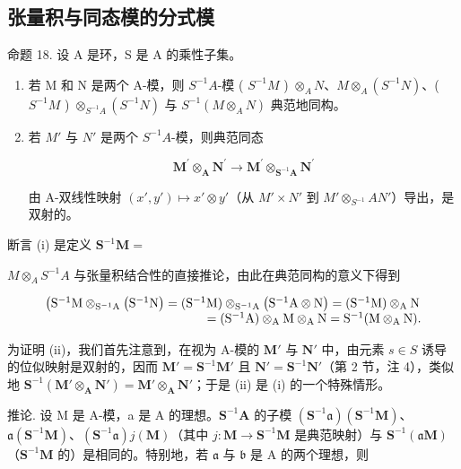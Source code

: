 \subsection{张量积与同态模的分式模}

命题 18. 设 A 是环，S 是 A 的乘性子集。

\begin{enumerate}
\def\labelenumi{(\roman{enumi})}
\tightlist
\item
  若 M 和 N 是两个 A-模，则 \(S^{-1}A\)-模 ( \(S^{-1}M\) ) \(\otimes_{A}N\)、\(M\otimes_{A}(S^{-1}N)\)、( \(S^{-1}M\) ) \(\otimes_{S^{-1}A}(S^{-1}N)\) 与 \(S^{-1}(M\otimes_{A}N)\) 典范地同构。
\item
  若 \(M'\) 与 \(N'\) 是两个 \(S^{-1}A\)-模，则典范同态

\[
\mathbf {M} ^ {\prime} \otimes_ {\mathbf {A}} \mathbf {N} ^ {\prime} \rightarrow \mathbf {M} ^ {\prime} \otimes_ {\mathbf {S} ^ {- 1} \mathbf {A}} \mathbf {N} ^ {\prime}
\]

由 A-双线性映射 \((x', y') \mapsto x' \otimes y'\)（从 \(M' \times N'\) 到 \(M' \otimes_{S^{-1}} A N'\)）导出，是双射的。

\end{enumerate}
断言 (i) 是定义 \(\mathbf{S}^{-1}\mathbf{M} =\)

\(M \otimes_{A} S^{-1} A\) 与张量积结合性的直接推论，由此在典范同构的意义下得到

\[
\begin{array}{r l} \left(\mathrm{S} ^ {- 1} \mathrm{M} \otimes_ {\mathrm{S} ^ {- 1} \mathrm{A}} \left(\mathrm{S} ^ {- 1} \mathrm{N}\right) = (\mathrm{S} ^ {- 1} \mathrm{M}) \otimes_ {\mathrm{S} ^ {- 1} \mathrm{A}} \left(\mathrm{S} ^ {- 1} \mathrm{A} \otimes \mathrm{N}\right) = (\mathrm{S} ^ {- 1} \mathrm{M}) \otimes_ {\mathrm{A}} \mathrm{N} \right. \\ = (\mathrm{S} ^ {- 1} \mathrm{A}) \otimes_ {\mathrm{A}} \mathrm{M} \otimes_ {\mathrm{A}} \mathrm{N} = \mathrm{S} ^ {- 1} (\mathrm{M} \otimes_ {\mathrm{A}} \mathrm{N}). \end{array}
\]

为证明 (ii)，我们首先注意到，在视为 A-模的 \(\mathbf{M}'\) 与 \(\mathbf{N}'\) 中，由元素 \(s \in S\) 诱导的位似映射是双射的，因而 \(\mathbf{M}' = \mathbf{S}^{-1}\mathbf{M}'\) 且 \(\mathbf{N}' = \mathbf{S}^{-1}\mathbf{N}'\)（第 2 节，注 4），类似地 \(\mathbf{S}^{-1}(\mathbf{M}' \otimes_{\mathbf{A}} \mathbf{N}') = \mathbf{M}' \otimes_{\mathbf{A}} \mathbf{N}'\)；于是 (ii) 是 (i) 的一个特殊情形。

推论. 设 M 是 A-模，a 是 A 的理想。\(\mathbf{S}^{-1}\mathbf{A}\) 的子模 \((\mathbf{S}^{-1}\mathfrak{a})(\mathbf{S}^{-1}\mathbf{M})\)、\(\mathfrak{a}(\mathbf{S}^{-1}\mathbf{M})\)、\((\mathbf{S}^{-1}\mathfrak{a})j(\mathbf{M})\)（其中 \(j: \mathbf{M} \to \mathbf{S}^{-1}\mathbf{M}\) 是典范映射）与 \(\mathbf{S}^{-1}(\mathfrak{a}\mathbf{M})\)（\(\mathbf{S}^{-1}\mathbf{M}\) 的）是相同的。特别地，若 \(\mathfrak{a}\) 与 \(\mathfrak{b}\) 是 A 的两个理想，则

